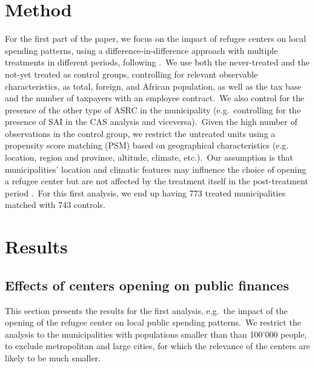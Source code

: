 \documentclass[authoryear,preprint,review,12pt]{elsarticle}
\begin{document}
\section*{Method}

\noindent
For the first part of the paper, we focus on the impact of refugee centers on local spending patterns, using a difference-in-difference approach with multiple treatments in different periods, following \cite{clarke2020}.\ We use both the never-treated and the not-yet treated as control groups, controlling for relevant observable characteristics, as total, foreign, and African population, as well as the tax base and the number of taxpayers with an employee contract.\ We also control for the presence of the other type of ASRC in the municipality (e.g.\ controlling for the presence of SAI in the CAS analysis and viceversa).\ Given the high number of observations in the control group, we restrict the untreated units using a propensity score matching (PSM) \citep{rubin1985} based on geographical characteristics (e.g. location, region and province, altitude, climate, etc.).\ Our assumption is that municipalities' location and climatic features may influence the choice of opening a refugee center but are not affected by the treatment itself in the post-treatment period \citep{Austin2011AnStudies}.\ For this first analysis, we end up having 773 treated municipalities matched with 743 controls.\\ 



\section*{Results}

\subsection*{Effects of centers opening on public finances}
\normalsize

\noindent
This section presents the results for the first analysis, e.g.\ the impact of the opening of the refugee center on local public spending patterns.\ We restrict the analysis to the municipalities with populations smaller than than 100'000 people, to exclude metropolitan and large cities, for which the relevance of the centers are likely to be much smaller.\\
\end{document}
